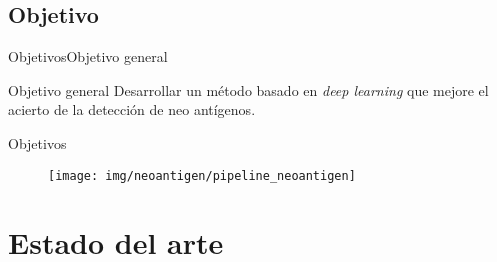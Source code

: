 \documentclass[10pt]{beamer}
\newcommand{\1}{
	\setbeamertemplate{background}{
		\texttt{[image: img/1]}
		\tikz[overlay] \fill[fill opacity=0.75,fill=white] (0,0) rectangle (-\paperwidth,\paperheight);
	}
}
\begin{document}
\subsection{Objetivo}

\begin{frame}{Objetivos}{Objetivo general}	
	\begin{block}{Objetivo general}
		Desarrollar un método basado en \textit{deep learning} que mejore el acierto de la detección de neo antígenos.
	\end{block}	
\end{frame}

\begin{frame}{Objetivos}{}	
	\begin{figure}
		\texttt{[image: img/neoantigen/pipeline\_neoantigen]}
	\end{figure}
\end{frame}


\section{Estado del arte}
\end{document}
